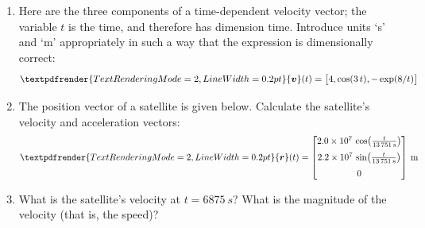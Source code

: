 \documentclass[a4paper,12pt,%
onecolumn,oneside,%
british%
]{memoir}
\renewcommand*{\bm}[1]{\textpdfrender{TextRenderingMode=2,LineWidth=0.2pt}{\boldsymbol{#1}}}
\renewcommand*{\|}[1][]{\nonscript\:#1\vert\nonscript\:\mathopen{}}
\newcommand*{\yr}{\bm{r}}
\begin{document}
\begin{exercise}
  \begin{enumerate}[exerc]
  \item Here are the three components of a time-dependent velocity vector; the variable $t$ is the time, and therefore has dimension \textsf{time}. Introduce units \enquote*{\unit{s}} and \enquote*{\unit{m}} appropriately in such a way that the expression is dimensionally correct:
    \begin{equation*}
      \bm{v}(t) = \bigl[4, \cos(3\,t), -\exp(8/t)\bigr]
    \end{equation*}
  \item The position vector of a satellite is given below. Calculate the satellite's velocity and acceleration vectors:
    \begin{equation*}
      \yr(t) =
      \begin{bmatrix}
        \num[exponent-mode=scientific]{20e+6}\,
        \cos\bigl(\frac{t}{\qty{13751}{s}}\bigr)\\[2\jot]
        \num[exponent-mode=scientific]{22e+6}\,
        \sin\bigl(\frac{t}{\qty{13751}{s}}\bigr)\\[2\jot]
        \num{0}
      \end{bmatrix}\:\unit{m}
    \end{equation*}
  \item What is the satellite's velocity at $t=\qty{6875}{s}$? What is the magnitude of the velocity (that is, the speed)?
  \end{enumerate}
\end{exercise}
\end{document}
